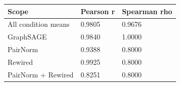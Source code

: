 \begin{tabular}{lll}
\toprule
Scope & Pearson r & Spearman rho \\
\midrule
All condition means & 0.9805 & 0.9676 \\
GraphSAGE & 0.9840 & 1.0000 \\
PairNorm & 0.9388 & 0.8000 \\
Rewired & 0.9925 & 0.8000 \\
PairNorm + Rewired & 0.8251 & 0.8000 \\
\bottomrule
\end{tabular}
